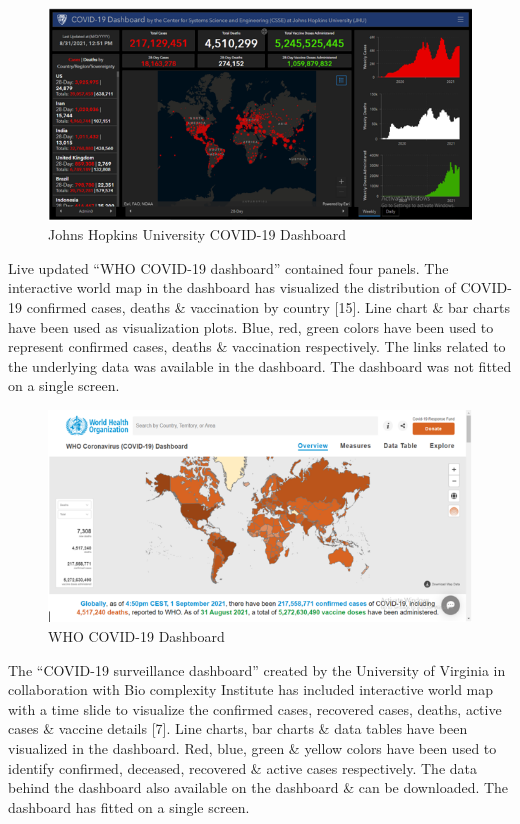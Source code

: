 \documentclass[
]{article}
\begin{document}
\begin{figure}
\includegraphics[width=8.42in]{Images/1} \caption{Johns Hopkins University COVID-19 Dashboard}\label{fig:unnamed-chunk-8}
\end{figure}

Live updated ``WHO COVID-19 dashboard'' contained four panels. The
interactive world map in the dashboard has visualized the distribution
of COVID-19 confirmed cases, deaths \& vaccination by country {[}15{]}.
Line chart \& bar charts have been used as visualization plots. Blue,
red, green colors have been used to represent confirmed cases, deaths \&
vaccination respectively. The links related to the underlying data was
available in the dashboard. The dashboard was not fitted on a single
screen.

\begin{figure}
\includegraphics[width=8.35in]{Images/2} \caption{WHO COVID-19 Dashboard}\label{fig:unnamed-chunk-9}
\end{figure}

The ``COVID-19 surveillance dashboard'' created by the University of
Virginia in collaboration with Bio complexity Institute has included
interactive world map with a time slide to visualize the confirmed
cases, recovered cases, deaths, active cases \& vaccine details {[}7{]}.
Line charts, bar charts \& data tables have been visualized in the
dashboard. Red, blue, green \& yellow colors have been used to identify
confirmed, deceased, recovered \& active cases respectively. The data
behind the dashboard also available on the dashboard \& can be
downloaded. The dashboard has fitted on a single screen.
\end{document}
